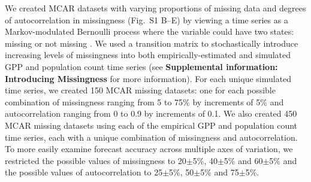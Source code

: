 \documentclass{article}
\begin{document}
We created MCAR datasets with varying proportions of missing data and degrees of autocorrelation in missingness (Fig.\ S1 B--E) by viewing a time series as a Markov-modulated Bernoulli process where the variable could have two states: missing or not missing \citep{Gharib2014, Edwards1960}. We used a transition matrix to stochastically introduce increasing levels of missingness into both empirically-estimated and simulated GPP and population count time series (see \textbf{Supplemental information: Introducing Missingness} for more information). For each unique simulated time series, we created 150 MCAR missing datasets: one for each possible combination of missingness ranging from 5 to 75\% by increments of 5\% and autocorrelation ranging from 0 to 0.9 by increments of 0.1. We also created 450 MCAR missing datasets using each of the empirical GPP and population count time series, each with a unique combination of missingness and autocorrelation. To more easily examine forecast accuracy across multiple axes of variation, we restricted the possible values of missingness to 20$\pm$5\%, 40$\pm$5\% and 60$\pm$5\% and the possible values of autocorrelation to 25$\pm$5\%, 50$\pm$5\% and 75$\pm$5\%.
\end{document}
